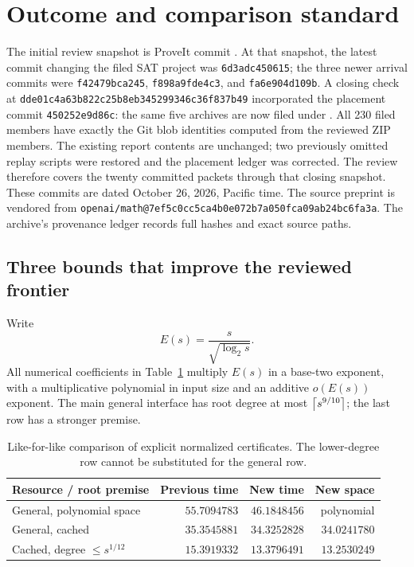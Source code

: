 \section{Outcome and comparison standard}
\label{sec:outcome}

The initial review snapshot is ProveIt commit \pin. At that snapshot,
the latest commit changing the filed SAT project was
\texttt{6d3adc450615}; the three newer arrival commits were
\texttt{f42479bca245}, \texttt{f898a9fde4c3}, and
\texttt{fa6e904d109b}. A closing check at
\texttt{dde01c4a63b822c25b8eb345299346c36f837b49} incorporated the
placement commit \texttt{450252e9d86c}: the same five archives are now
filed under . All 230 filed members have exactly the
Git blob identities computed from the reviewed ZIP members.
The existing report contents are unchanged; two previously omitted
replay scripts were restored and the placement ledger was corrected.
The review therefore covers the twenty committed packets through
that closing snapshot. These commits are dated October 26, 2026,
Pacific time.
The source preprint is vendored from
\texttt{openai/math@7ef5c0cc5ca4b0e072b7a050fca09ab24bc6fa3a}.
The archive's provenance ledger records full hashes and exact source paths.

\subsection{Three bounds that improve the reviewed frontier}

Write
\[
 E(s)=\frac{s}{\sqrt{\log_2s}}.
\]
All numerical coefficients in Table~\ref{tab:outcomes} multiply $E(s)$
in a base-two exponent, with a multiplicative polynomial in input size and
an additive $o(E(s))$ exponent. The main general interface has root
degree at most $\left\lceil s^{9/10}\right\rceil$; the last row has a stronger premise.

\begin{table}[ht]
\centering
\small
\begin{tabular}{@{}p{}rrr@{}}
\toprule
Resource / root premise & Previous time & New time & New space\\
\midrule
General, polynomial space & $55.7094783$ & $46.1848456$ & polynomial\\
General, cached & $35.3545881$ & $34.3252828$ & $34.0241780$\\
Cached, degree $\le s^{1/12}$ & $15.3919332$ & $13.3796491$ & $13.2530249$\\
\bottomrule
\end{tabular}
\caption{Like-for-like comparison of explicit normalized certificates.
The lower-degree row cannot be substituted for the general row.}
\label{tab:outcomes}
\end{table}

